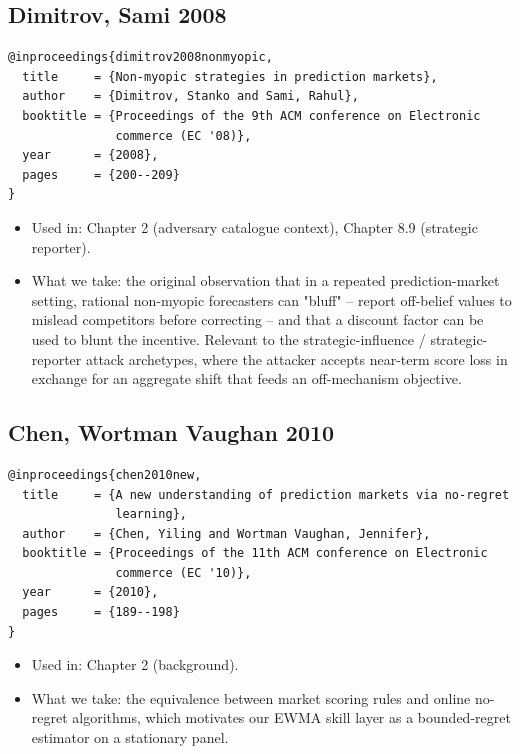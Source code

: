 \documentclass[11pt,a4paper,openany]{report}
\begin{document}
\subsection{Dimitrov, Sami 2008}

\begin{verbatim}
@inproceedings{dimitrov2008nonmyopic,
  title     = {Non-myopic strategies in prediction markets},
  author    = {Dimitrov, Stanko and Sami, Rahul},
  booktitle = {Proceedings of the 9th ACM conference on Electronic
               commerce (EC '08)},
  year      = {2008},
  pages     = {200--209}
}
\end{verbatim}

\begin{itemize}
  \item Used in: Chapter 2 (adversary catalogue context), Chapter 8.9
    (strategic reporter).
  \item What we take: the original observation that in a repeated
    prediction-market setting, rational non-myopic forecasters can
    "bluff" -- report off-belief values to mislead competitors before
    correcting -- and that a discount factor can be used to blunt the
    incentive. Relevant to the strategic-influence / strategic-reporter
    attack archetypes, where the attacker accepts near-term score loss
    in exchange for an aggregate shift that feeds an off-mechanism
    objective.
\end{itemize}

\subsection{Chen, Wortman Vaughan 2010}

\begin{verbatim}
@inproceedings{chen2010new,
  title     = {A new understanding of prediction markets via no-regret
               learning},
  author    = {Chen, Yiling and Wortman Vaughan, Jennifer},
  booktitle = {Proceedings of the 11th ACM conference on Electronic
               commerce (EC '10)},
  year      = {2010},
  pages     = {189--198}
}
\end{verbatim}

\begin{itemize}
  \item Used in: Chapter 2 (background).
  \item What we take: the equivalence between market scoring rules and
    online no-regret algorithms, which motivates our EWMA skill layer
    as a bounded-regret estimator on a stationary panel.
\end{itemize}
\end{document}
